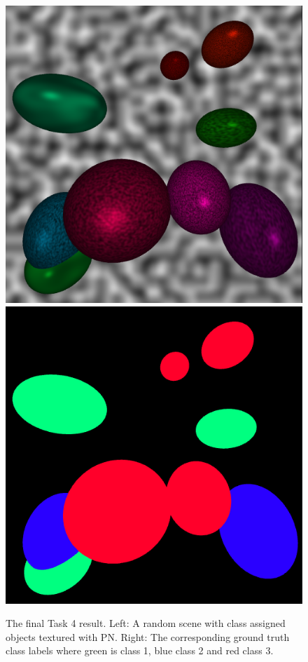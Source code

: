 \documentclass[12pt,fleqn]{article}
\begin{document}
\begin{figure}[H]
    \centering
        \includegraphics[width=0.49\linewidth]{t4-img}
        \includegraphics[width=0.49\linewidth]{t4-labelmap}
    \caption{
        The final Task 4 result.
        Left: A random scene with class assigned objects textured with PN. Right: The corresponding ground truth class labels where green is class 1, blue class 2 and red class 3.
    }
    \label{fig:t4}
\end{figure}\noindent
\end{document}
